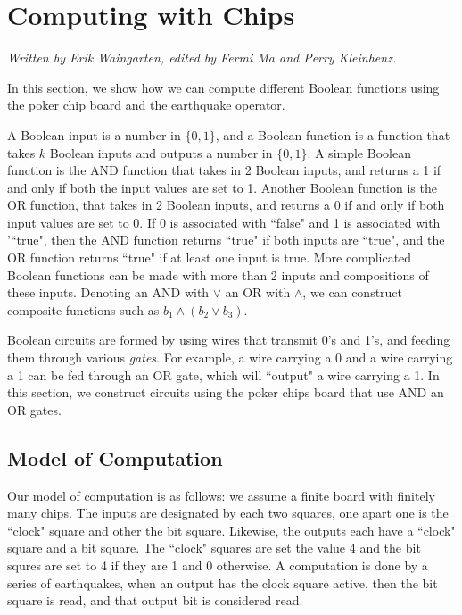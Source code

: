 \documentclass[runningheads,a4paper]{llncs}
\begin{document}
\section{Computing with Chips}
\label{Computing with Chips}

\emph{Written by Erik Waingarten, edited by Fermi Ma and Perry Kleinhenz.}

In this section, we show how we can compute different Boolean functions using the poker chip board and the earthquake operator.

A Boolean input is a number in $\{0,1\}$, and a Boolean function is a function that takes $k$ Boolean inputs and outputs a number in $\{0,1\}$. A simple Boolean function is the AND function that takes in 2 Boolean inputs, and returns a 1 if and only if both the input values are set to 1. Another Boolean function is the OR function, that takes in 2 Boolean inputs, and returns a 0 if and only if both input values are set to 0. If 0 is associated with ``false" and 1 is associated with '``true", then the AND function returns ``true" if both inputs are ``true", and the OR function returns ``true" if at least one input is true. More complicated Boolean functions can be made with more than 2 inputs and compositions of these inputs. Denoting an AND with $\vee$ an OR with $\wedge$, we can construct composite functions such as $b_1 \wedge (b_2 \vee b_3)$. 

Boolean circuits are formed by using wires that transmit 0's and 1's, and feeding them through various \emph{gates}. For example, a wire carrying a 0 and a wire carrying a 1 can be fed through an OR gate, which will ``output" a wire carrying a 1. In this section, we construct circuits using the poker chips board that use AND an OR gates. 

\subsection{Model of Computation}

Our model of computation is as follows: we assume a finite board with finitely many chips. The inputs are designated by each two squares, one apart one is the ``clock" square and other the bit square. Likewise, the outputs each have a ``clock" square and a bit square. The ``clock" squares are set the value 4 and the bit squres are set to 4 if they are 1 and 0 otherwise. A computation is done by a series of earthquakes, when an output has the clock square active, then the bit square is read, and that output bit is considered read. 
\end{document}
